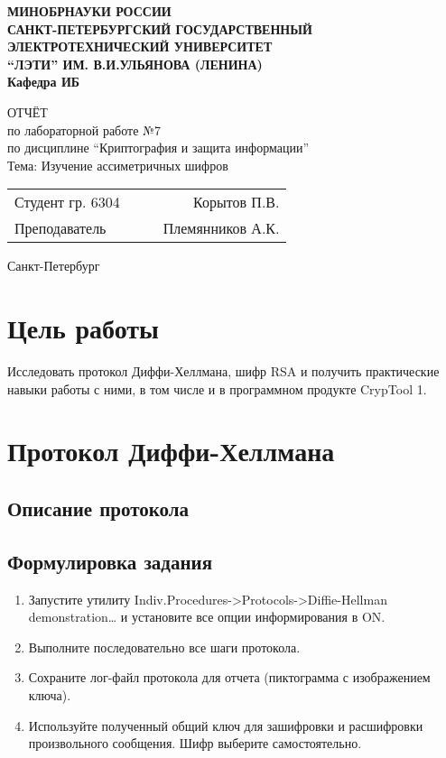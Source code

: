 \documentclass[a4paper, 14pt]{extarticle}
\begin{document}
\begin{titlepage}
    \centering
    {\bfseries
        \uppercase{
            Минобрнауки России \\
            Санкт-Петербургский государственный \\
            Электротехнический университет \\
            \enquote{ЛЭТИ} им. В.И.Ульянова (Ленина)\\
        }
        Кафедра ИБ

        \vspace{\fill}
        \uppercase{Отчёт} \\
        по лабораторной работе №7 \\
        по дисциплине \enquote{Криптография и защита информации} \\
        Тема: Изучение ассиметричных шифров
    }

    \vspace{\fill}
    \begin{tabularx}{0.8\textwidth}{l X c r}
        Студент гр. 6304 & & \underline{\hspace{3cm}} & Корытов П.В.\\
        Преподаватель & & \underline{\hspace{3cm}} & Племянников А.К.
    \end{tabularx}

    \vspace{1cm}
    Санкт-Петербург \\
    \the\year{}
\end{titlepage}
\section*{Цель работы}
Исследовать протокол Диффи-Хеллмана, шифр RSA и получить практические навыки работы с ними, в том числе и в программном продукте CrypTool 1.

\section{Протокол Диффи-Хеллмана}
\subsection{Описание протокола}
\lipsum[1] %

\subsection{Формулировка задания}
\begin{enumerate}
    \item Запустите утилиту Indiv.Procedures->Protocols->Diffie-Hellman demonstration… и установите все опции информирования в ON.\@
    \item  Выполните последовательно все шаги протокола.
    \item  Сохраните лог-файл протокола для отчета (пиктограмма с изображением ключа).
    \item  Используйте полученный общий ключ для зашифровки и расшифровки произвольного сообщения. Шифр выберите самостоятельно.
\end{enumerate}
\end{document}
